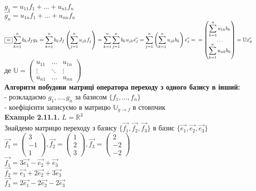 \documentclass[a4paper, 14pt]{extarticle}
\def\huge{\displaystyle}
\def\bigline{\vspace{5mm}\\}
\begin{document}
$g_1 = u_{11}f_1 + \dots + u_{n1}f_n$\\
$\dots$\\
$g_n = u_{1n}f_1 + \dots + u_{nn}f_n$\\
$\boxed{=} \huge \sum_{k=1}^n b_k J_f g_k = \sum_{k=1}^n b_k J_f \left(\sum_{j=1}^n u_{jk} f_j\right) = \sum_{k=1}^n \sum_{j=1}^n b_k u_{jk} \vec{e_j} = \sum_{j=1}^n \left(\sum_{k=1}^n u_{jk} b_k \right) \vec{e_j} = \\ = \begin{pmatrix}
 \huge \sum_{k=1}^n u_{1k} b_k \\ \dots \\ \huge \sum_{k=1}^n u_{nk} b_k
\end{pmatrix} = \mathbb{U} \vec{x_g}$\\
де $\mathbb{U} = \begin{pmatrix}
u_{11} & \dots & u_{1n} \\
\vdots & \ddots & \vdots \\
u_{n1} & \dots & u_{nn}
\end{pmatrix}$
\bigline
\textbf{Алгоритм побудови матриці оператора переходу з одного базису в інший:}\\
- розкладаємо $g_1,\dots,g_n$ за базисом $\{f_1,\dots,f_n\}$\\
- коефіцієнти записуємо в матрицю $\mathbb{U}_{g \to f}$ в стовпчик
\bigline
\textbf{Example 2.11.1.} $L = \mathbb{R}^3$\\
Знайдемо матрицю переходу з базису $\{\vec{f_1},\vec{f_2},\vec{f_3}\}$ в базис $\{\vec{e_1},\vec{e_2}, \vec{e_3}\}$\\
$\vec{f_1} = \begin{pmatrix}
3 \\ -1 \\ 1
\end{pmatrix}, \vec{f_2} = \begin{pmatrix}
1 \\ 2 \\ 3
\end{pmatrix}, \vec{f_3} = \begin{pmatrix}
2 \\ -2 \\ -2
\end{pmatrix}$\\
$\vec{f_1} = 3\vec{e_1} -\vec{e_2} + \vec{e_3}$\\
$\vec{f_2} = \vec{e_1} +2\vec{e_2} + 3\vec{e_3}$\\
$\vec{f_3} = 2\vec{e_1} -2\vec{e_2} -2\vec{e_3}$\\
\end{document}
